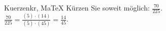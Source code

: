 \begin{MAufgabe}{Kuerzen}{kr, MaTeX}
K\"urzen Sie soweit m\"oglich: $\frac{70}{225}$.\\ 
\ifLsg\MLoesung
\quad $\frac{70}{225}=\frac{(5)\cdot(14)}{(5)\cdot(45)}=\frac{14}{45}$.\else\relax\fi
 \end{MAufgabe}